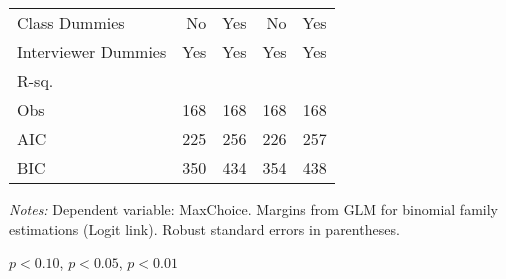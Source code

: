 \begin{table}[htbp]
\begin{threeparttable}
\begin{tabular}{l*{4}{D{.}{.}{-1}}}
Class Dummies       &                  No   &                 Yes   &                  No   &                 Yes   \\
Interviewer Dummies &                 Yes   &                 Yes   &                 Yes   &                 Yes   \\
\midrule
R-sq.               &                       &                       &                       &                       \\
Obs                 &                 168   &                 168   &                 168   &                 168   \\
AIC                 &                 225   &                 256   &                 226   &                 257   \\
BIC                 &                 350   &                 434   &                 354   &                 438   \\
\bottomrule
\end{tabular}
\begin{tablenotes}
\footnotesize
\item \textit{Notes:} Dependent variable: MaxChoice. Margins from GLM for binomial family estimations (Logit link). Robust standard errors in parentheses.
\item \sym{*} \(p<0.10\), \sym{**} \(p<0.05\), \sym{***} \(p<0.01\)
\end{tablenotes}
\end{threeparttable}
\label{tab:maxchoice_totaltr}
\end{table}
